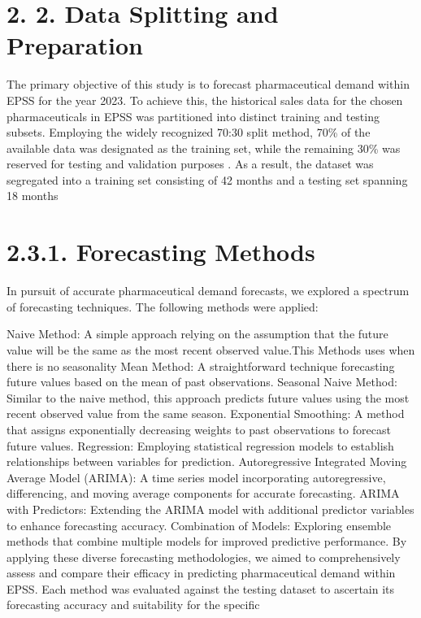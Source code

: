 \documentclass[
  authoryear,
  preprint,
  3p]{elsarticle}
\begin{document}
\hypertarget{data-splitting-and-preparation}{%
\section{2. 2. Data Splitting and
Preparation}\label{data-splitting-and-preparation}}

The primary objective of this study is to forecast pharmaceutical demand
within EPSS for the year 2023. To achieve this, the historical sales
data for the chosen pharmaceuticals in EPSS was partitioned into
distinct training and testing subsets. Employing the widely recognized
70:30 split method, 70\% of the available data was designated as the
training set, while the remaining 30\% was reserved for testing and
validation purposes \citep{chan2019comparison}. As a result, the dataset
was segregated into a training set consisting of 42 months and a testing
set spanning 18 months

\hypertarget{forecasting-methods}{%
\section{2.3.1. Forecasting Methods}\label{forecasting-methods}}

In pursuit of accurate pharmaceutical demand forecasts, we explored a
spectrum of forecasting techniques. The following methods were applied:

Naive Method: A simple approach relying on the assumption that the
future value will be the same as the most recent observed value.This
Methods uses when there is no seasonality
\citetext{\citealp[burinskiene2022forecasting]{article}; \citealp[nikolopoulos2016forecasting]{article}}
Mean Method: A straightforward technique forecasting future values based
on the mean of past observations. Seasonal Naive Method: Similar to the
naive method, this approach predicts future values using the most recent
observed value from the same season. Exponential Smoothing: A method
that assigns exponentially decreasing weights to past observations to
forecast future values. Regression: Employing statistical regression
models to establish relationships between variables for prediction.
Autoregressive Integrated Moving Average Model (ARIMA): A time series
model incorporating autoregressive, differencing, and moving average
components for accurate forecasting. ARIMA with Predictors: Extending
the ARIMA model with additional predictor variables to enhance
forecasting accuracy. Combination of Models: Exploring ensemble methods
that combine multiple models for improved predictive performance. By
applying these diverse forecasting methodologies, we aimed to
comprehensively assess and compare their efficacy in predicting
pharmaceutical demand within EPSS. Each method was evaluated against the
testing dataset to ascertain its forecasting accuracy and suitability
for the specific
\end{document}
